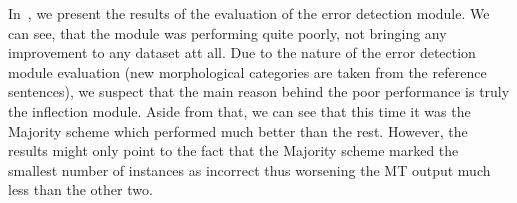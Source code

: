 \begin{table}[t]
\centering
\small
{}
\caption[Automatic evaluation of the German morphological prediction module]{
    Automatic evaluation of German morphological prediction module using BLEU metric
	and the relative improvement over the baseline MT output.
	Values are multiplied by 100 for easier reading.
	Performance of
	Oracle classifier is provided for comparison.
	The best model for each dataset is printed in bold.
}
\label{fixonly_de-summary}
\end{table}


In~, we present the results of the evaluation of the error detection module.
We can see, that the module was performing quite poorly, not bringing any improvement to any dataset att all. Due to the nature of the error detection module evaluation (new morphological categories are taken from the reference sentences), we suspect that the main reason behind the poor performance is truly the
inflection module. Aside from that, we can see that this time it was the Majority scheme which performed
 much better than the rest. However, the results might only point to the fact that the Majority scheme
 marked the smallest number of instances as incorrect thus worsening the MT output much less than the
 other two.

